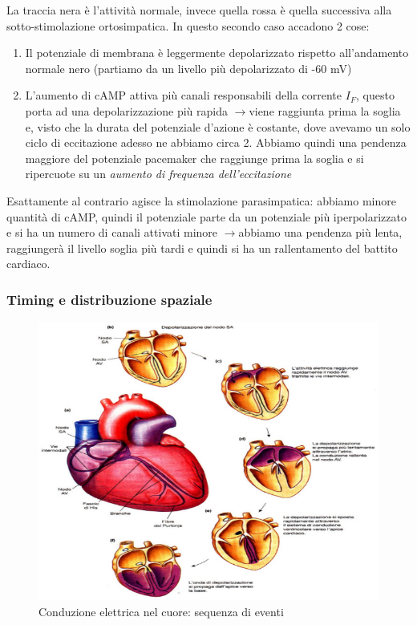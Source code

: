 \documentclass[a4paper,12pt]{article}
\newcommand{\lfreccia}{\ensuremath{\longrightarrow}}
\begin{document}
La traccia nera è l'attività normale, invece quella rossa è quella successiva alla sotto-stimolazione ortosimpatica. In questo secondo caso accadono 2 cose:
\begin{enumerate}
\item{Il potenziale di membrana è leggermente depolarizzato rispetto all'andamento normale nero (partiamo da un livello più depolarizzato di -60 mV)}
\item{L'aumento di cAMP attiva più canali responsabili della corrente $I_{F}$, questo porta ad una depolarizzazione più rapida \lfreccia viene raggiunta prima la soglia e, visto che la durata del potenziale d'azione è costante, dove avevamo un solo ciclo di eccitazione adesso ne abbiamo circa 2. Abbiamo quindi una pendenza maggiore del potenziale pacemaker che raggiunge prima la soglia e si ripercuote su un \emph{aumento di frequenza dell'eccitazione}}
\end{enumerate}
Esattamente al contrario agisce la stimolazione parasimpatica: abbiamo minore quantità di cAMP, quindi il potenziale parte da un potenziale più iperpolarizzato e si ha un numero di canali attivati minore \lfreccia abbiamo una pendenza più lenta, raggiungerà il livello soglia più tardi e quindi si ha un rallentamento del battito cardiaco.

\subsubsection{Timing e distribuzione spaziale}
\begin{figure}[H]
\centering
\includegraphics[scale=0.5]{immagine/sequenza.jpg}
\caption{Conduzione elettrica nel cuore: sequenza di eventi}
\end{figure}
\end{document}
